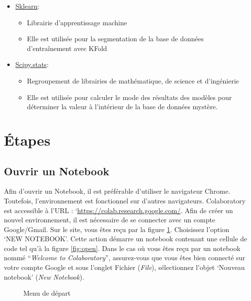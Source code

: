 \documentclass{article}
\begin{document}
\begin{itemize}
  \item \href{https://scikit-learn.org/stable/auto_examples/index.html#}{Sklearn}:
    \begin{itemize}
      \item Librairie d'apprentissage machine
      \item Elle est utilisée pour la segmentation de la base de données d'entraînement avec KFold
    \end{itemize}
  \item \href{https://docs.scipy.org/doc/scipy/reference/stats.html}{Scipy.stats}:
    \begin{itemize}
      \item Regroupement de librairies de mathématique, de science et d'ingénierie
      \item Elle est utilisée pour calculer le mode des résultats des modèles pour déterminer la valeur à l'intérieur de la base de données mystère.
    \end{itemize}
\end{itemize}

\section{Étapes} %
\subsection{Ouvrir un Notebook}
Afin d'ouvrir un Notebook, il est préférable d'utiliser le navigateur Chrome. Toutefois, l'environnement est fonctionnel sur d'autres navigateurs.
\medbreak
Colaboratory est accessible à l'URL : `\href{https://colab.research.google.com/}{https://colab.research.google.com/}. Afin de créer un nouvel environnement, il est nécessaire de se connecter avec un compte Google/Gmail.
\medbreak
Sur le site, vous êtes reçu par la figure \ref{fig:start}. Choisissez l'option `NEW NOTEBOOK'. Cette action démarre un notebook contenant une cellule de code tel qu'à la figure \ref{fig:open}. Dans le cas où vous êtes reçu par un notebook nommé ``\textit{Welcome to Colaboratory}'', assurez-vous que vous êtes bien connecté sur votre compte Google et sous l'onglet Fichier (\textit{File}), sélectionnez l'objet `Nouveau notebook' (\textit{New Notebook}).

\begin{figure}[H]
  \centering
  \caption{Menu de départ}
  \label{fig:start}
\end{figure}
\end{document}
